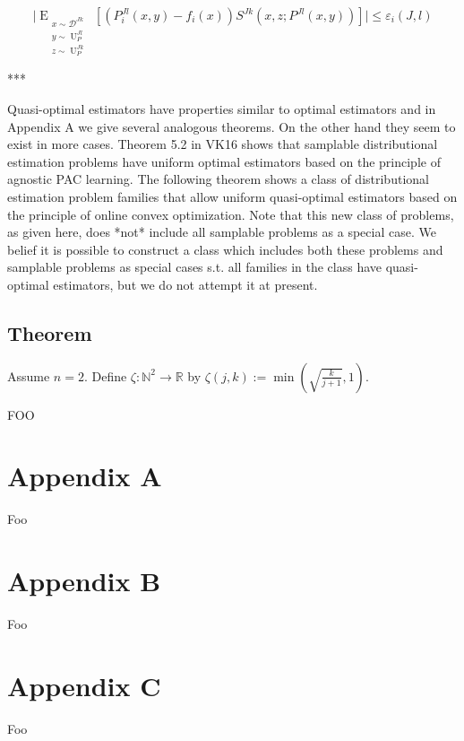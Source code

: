 \documentclass[a4paper]{article}
\newcommand{\EEE}[3]{\operatorname{E}_{\substack{#1 \\ #2 \\ #3}}}
\DeclareMathOperator{\Un}{U}
\newcommand{\Nats}{\mathbb{N}}
\newcommand{\Reals}{\mathbb{R}}
\newcommand{\Abs}[1]{\lvert #1 \rvert}
\newcommand{\Dist}{\mathcal{D}}
\begin{document}
$$\Abs{\EEE{x \sim \Dist^{Jk}}{y \sim \Un_P^{Jl}}{z \sim \Un_P^{Jk}}[(P_i^{Jl}(x,y)-f_i(x))S^{Jk}(x,z;P^{Jl}(x,y))]} \leq \varepsilon_i(J,l)$$

***

Quasi-optimal estimators have properties similar to optimal estimators and in Appendix A we give several analogous theorems. On the other hand they seem to exist in more cases. Theorem 5.2 in VK16 shows that samplable distributional estimation problems have uniform optimal estimators based on the principle of agnostic PAC learning. The following theorem shows a class of distributional estimation problem families that allow uniform quasi-optimal estimators based on the principle of online convex optimization. Note that this new class of problems, as given here, does *not* include all samplable problems as a special case. We belief it is possible to construct a class which includes both these problems and samplable problems as special cases s.t. all families in the class have quasi-optimal estimators, but we do not attempt it at present.

\subsection{Theorem}

Assume ${n=2}$. Define ${\zeta: \Nats^2 \rightarrow \Reals}$ by ${\zeta(j,k):=\min(\sqrt{\frac{k}{j+1}},1)}$.

FOO

\section{Appendix A}

Foo

\section{Appendix B}

Foo

\section{Appendix C}

Foo
\end{document}
